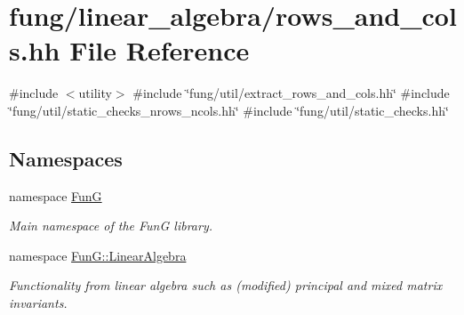 \hypertarget{rows__and__cols_8hh}{\section{fung/linear\-\_\-algebra/rows\-\_\-and\-\_\-cols.hh \-File \-Reference}
\label{rows__and__cols_8hh}
}
{\ttfamily \#include $<$utility$>$}\*
{\ttfamily \#include \char`\"{}fung/util/extract\-\_\-rows\-\_\-and\-\_\-cols.\-hh\char`\"{}}\*
{\ttfamily \#include \char`\"{}fung/util/static\-\_\-checks\-\_\-nrows\-\_\-ncols.\-hh\char`\"{}}\*
{\ttfamily \#include \char`\"{}fung/util/static\-\_\-checks.\-hh\char`\"{}}\*
\subsection*{\-Namespaces}
\begin{DoxyCompactItemize}
\item 
namespace \hyperlink{namespaceFunG}{\-Fun\-G}
\begin{DoxyCompactList}\small\item\em \-Main namespace of the \-Fun\-G library. \end{DoxyCompactList}\item 
namespace \hyperlink{namespaceFunG_1_1LinearAlgebra}{\-Fun\-G\-::\-Linear\-Algebra}
\begin{DoxyCompactList}\small\item\em \-Functionality from linear algebra such as (modified) principal and mixed matrix invariants. \end{DoxyCompactList}\end{DoxyCompactItemize}
